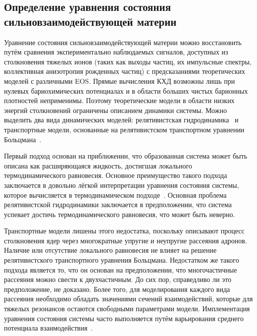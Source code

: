 \subsection{Определение уравнения состояния сильновзаимодействующей материи}

Уравнение состояния сильновзаимодействующей материи можно восстановить путём сравнения экспериментально наблюдаемых сигналов, доступных из столкновения тяжелых ионов (таких как выходы частиц, их импульсные спектры, коллективная анизотропия рожденных частиц) с предсказаниями теоретических моделей с различными EOS.
Прямые вычисления КХД возможны лишь при нулевых бариохимических потенциалах и в области больших чистых барионных плотностей неприменимы.
Поэтому теоретические модели в области низких энергий столкновений ограничены описанием динамики системы.
Можно выделить два вида динамических моделей: релятивистская гидродинамика~\cite{Stoecker:1986ci,Hung:1994eq,Werner:2010aa} и транспортные модели, основанные на релятивистском транспортном уравнении Больцмана~\cite{Molnar:2004yh,Xu:2004mz}.

Первый подход основан на приближении, что образованная система может быть описана как расширяющаяся жидкость, достигшая локального термодинамического равновесия. 
Основное преимущество такого подхода заключается в довольно лёгкой интерпретации уравнения состояния системы, которое вычисляется в термодинамическом подходе~\cite{Stoecker:1986ci}.
Основная проблема релятивистской гидродинамики заключается в предположении, что система успевает достичь термодинамического равновесия, что может быть неверно.

Транспортные модели лишены этого недостатка, поскольку описывают процесс столкновения ядер через многократные упругие и неупругие рассеяния адронов.
Наличие или отсутствие локального равновесия не влияет на решение релятивистского транспортного уравнения Больцмана.
Недостатком же такого подхода является то, что он основан на предположении, что многочастичные рассеяния можно свести к двухчастичным.
До сих пор, справедливо ли это предположение, не доказано.
Более того, для моделирования каждого вида рассеяния необходимо обладать значениями сечений взаимодействий, которые для тяжелых резонансов остаются свободными параметрами модели.
Имплементация уравнения состояния системы часто выполняется путём варьирования среднего потенциала взаимодействия~\cite{Nara:2016hbg}.

